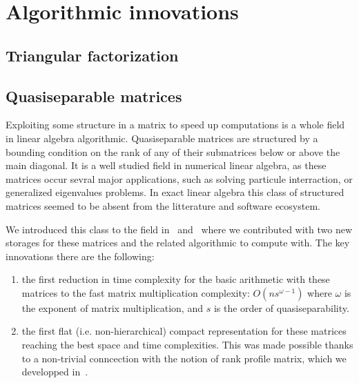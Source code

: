 \documentclass{deliverablereport}
\author{Clément Pernet and Jean-Guillaume Dumas}
\begin{document}
\maketitle
\githubissuedescription

\section{Algorithmic innovations}

\subsection{Triangular factorization}

\cite{DuPe18}
\cite{DPS17}

\subsection{Quasiseparable matrices}

Exploiting some structure in a matrix to speed up computations is a whole field
in linear algebra algorithmic. Quasiseparable matrices are  structured by a
bounding condition on the rank of any of their submatrices below or above
the main diagonal. It is a well studied field in numerical linear algebra, as
these matrices occur sevral major applications, such as solving particule
interraction, or generalized eigenvalues problems.
In exact linear algebra this class of structured matrices seemed to be absent
from the litterature and software ecosystem.

We introduced this class to the field in~\cite{Per16} and~\cite{PeSt18} where we
contributed with two new storages for these matrices and the related algorithmic
to compute with. The key innovations there are the following:
\begin{enumerate}
\item the first reduction in time complexity for the basic arithmetic with these
  matrices to the fast matrix multiplication complexity: $O(ns^{\omega-1})$
  where $\omega$ is the exponent of matrix multiplication, and $s$ is the order
  of quasiseparability.
\item the first flat (i.e. non-hierarchical) compact representation for these
  matrices reaching the best space and time complexities. This was made possible
  thanks to a non-trivial conncection with the notion of rank profile matrix,
  which we developped in~\cite{DPS17}.
\end{enumerate}
\end{document}
